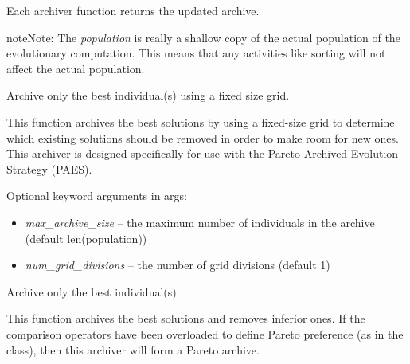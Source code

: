 \documentclass[letterpaper,10pt,english]{sphinxmanual}
\begin{document}
Each archiver function returns the updated archive.

\begin{notice}{note}{Note:}
The \emph{population} is really a shallow copy of the actual population of
the evolutionary computation. This means that any activities like
sorting will not affect the actual population.
\end{notice}
\label{reference:module-archivers}

\begin{fulllineitems}
\label{reference:inspyred.ec.archivers.adaptive_grid_archiver}
Archive only the best individual(s) using a fixed size grid.

This function archives the best solutions by using a fixed-size grid
to determine which existing solutions should be removed in order to
make room for new ones. This archiver is designed specifically for
use with the Pareto Archived Evolution Strategy (PAES).

Optional keyword arguments in args:
\begin{itemize}
\item {} 
\emph{max\_archive\_size} -- the maximum number of individuals in the archive
(default len(population))

\item {} 
\emph{num\_grid\_divisions} -- the number of grid divisions (default 1)

\end{itemize}

\end{fulllineitems}


\begin{fulllineitems}
\label{reference:inspyred.ec.archivers.best_archiver}
Archive only the best individual(s).

This function archives the best solutions and removes inferior ones.
If the comparison operators have been overloaded to define Pareto
preference (as in the  class), then this archiver will form 
a Pareto archive.

\end{fulllineitems}
\end{document}
